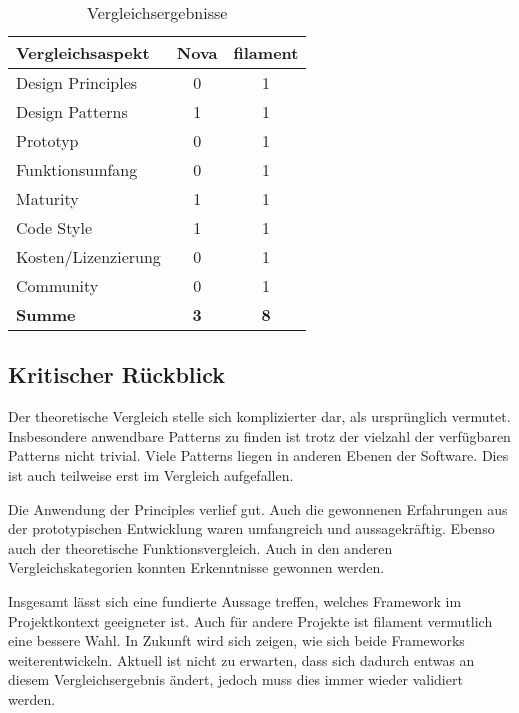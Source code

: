 \begin{table}[h!]
    \centering
    \caption{Vergleichsergebnisse}
    \label{tab:vergleichsergebnisse}
    \begin{tabular}{|l|c|c|}
        \hline
        \textbf{Vergleichsaspekt} & \textbf{Nova} & \textbf{filament} \\ \hline
        Design Principles         & 0             & 1                 \\ \hline
        Design Patterns           & 1             & 1                 \\ \hline
        Prototyp                  & 0             & 1                 \\ \hline
        Funktionsumfang           & 0             & 1                 \\ \hline
        Maturity                  & 1             & 1                 \\ \hline
        Code Style                & 1             & 1                 \\ \hline
        Kosten/Lizenzierung       & 0             & 1                 \\ \hline
        Community                 & 0             & 1                 \\ \hline
        \textbf{Summe}            & \textbf{3}    & \textbf{8}        \\ \hline
    \end{tabular}
\end{table}

\subsection{Kritischer Rückblick}
Der theoretische Vergleich stelle sich komplizierter dar, als ursprünglich vermutet.
Insbesondere anwendbare Patterns zu finden ist trotz der vielzahl der verfügbaren Patterns nicht trivial.
Viele Patterns liegen in anderen Ebenen der Software.
Dies ist auch teilweise erst im Vergleich aufgefallen.

Die Anwendung der Principles verlief gut.
Auch die gewonnenen Erfahrungen aus der prototypischen Entwicklung waren umfangreich und aussagekräftig.
Ebenso auch der theoretische Funktionsvergleich.
Auch in den anderen Vergleichskategorien konnten Erkenntnisse gewonnen werden.

Insgesamt lässt sich eine fundierte Aussage treffen, welches Framework im Projektkontext geeigneter ist.
Auch für andere Projekte ist filament vermutlich eine bessere Wahl.
In Zukunft wird sich zeigen, wie sich beide Frameworks weiterentwickeln.
Aktuell ist nicht zu erwarten, dass sich dadurch entwas an diesem Vergleichsergebnis ändert, jedoch muss dies immer wieder validiert werden.
